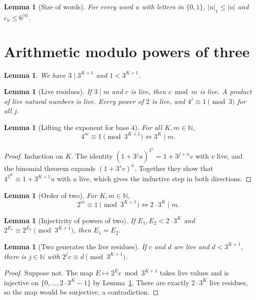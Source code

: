 \documentclass[11pt,reqno,oneside]{amsart}
\theoremstyle{plain}
\newtheorem{lemma}[theorem]{Lemma}
\theoremstyle{definition}
\numberwithin{equation}{section}
\begin{document}
\begin{lemma}[Size of words]\label{lem:wordsize}
For every word $u$ with letters in $\{0,1\}$, $|u|_1\le|u|$ and $c_u\le6^{|u|}$.
\end{lemma}

\section{Arithmetic modulo powers of three}\label{sec:arith}

\begin{lemma}\label{lem:three}
We have $3\mid3^{K+1}$ and $1<3^{K+1}$.
\end{lemma}

\begin{lemma}[Live residues]\label{lem:live}
If $3\mid m$ and $c$ is live, then $c\bmod m$ is live. A product of live natural numbers is live. Every power of $2$ is live, and $4^j\equiv1\pmod 3$ for all $j$.
\end{lemma}

\begin{lemma}[Lifting the exponent for base $4$]\label{lem:lte}
For all $K,m\in\mathbb N$,
\[
4^m\equiv1\pmod{3^{K+1}}\iff 3^K\mid m.
\]
\end{lemma}
\begin{proof}
Induction on $K$. The identity $(1+3^ju)^{3^n}=1+3^{j+n}v$ with $v$ live, and the binomial theorem expands $(1+3^sv)^n$. Together they show that $4^{3^K}\equiv1+3^{K+1}u$ with $u$ live, which gives the inductive step in both directions.
\end{proof}

\begin{lemma}[Order of two]\label{lem:order2}
For $K,m\in\mathbb N$,
\[
2^m\equiv1\pmod{3^{K+1}}\iff 2\cdot3^K\mid m.
\]
\end{lemma}

\begin{lemma}[Injectivity of powers of two]\label{lem:inj2}
If $E_1,E_2<2\cdot3^K$ and $2^{E_1}\equiv2^{E_2}\pmod{3^{K+1}}$, then $E_1=E_2$.
\end{lemma}

\begin{lemma}[Two generates the live residues]\label{lem:gen}
If $c$ and $d$ are live and $d<3^{K+1}$, there is $j\in\mathbb N$ with $2^jc\equiv d\pmod{3^{K+1}}$.
\end{lemma}
\begin{proof}
Suppose not. The map $E\mapsto2^Ec\bmod3^{K+1}$ takes live values and is injective on $\{0,\dots,2\cdot3^K-1\}$ by Lemma~\ref{lem:inj2}. There are exactly $2\cdot3^K$ live residues, so the map would be surjective, a contradiction.
\end{proof}
\end{document}
